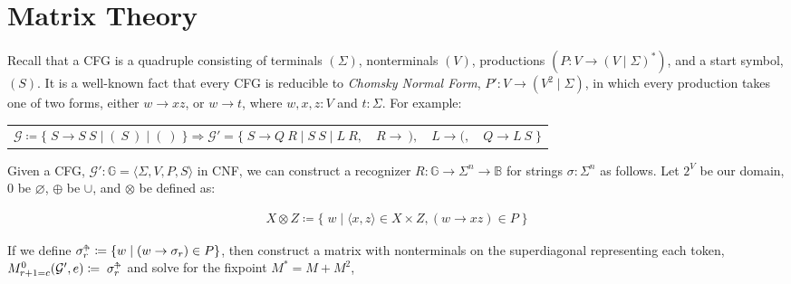\documentclass[sigplan,review,anonymous,acmsmall]{acmart}\settopmatter{printfolios=false,printccs=false,printacmref=false}
\begin{document}
\section{Matrix Theory}\label{sec:matrix}

Recall that a CFG is a quadruple consisting of terminals $(\Sigma)$, nonterminals $(V)$, productions $(P\colon V \rightarrow (V \mid \Sigma)^*)$, and a start symbol, $(S)$. It is a well-known fact that every CFG is reducible to \textit{Chomsky Normal Form}, $P'\colon V \rightarrow (V^2 \mid \Sigma)$, in which every production takes one of two forms, either $w \rightarrow xz$, or $w \rightarrow t$, where $w, x, z: V$ and $t: \Sigma$. For example:\vspace{-3pt}

\begin{table}[H]
\begin{tabular}{llll}
$\mathcal{G}\coloneqq\big\{\;S \rightarrow S\:S \mid (\:S\:) \mid (\:)\;\big\} \Longrightarrow \mathcal{G}'=\big\{\;S\rightarrow Q\:R \mid S\:S \mid L\:R,$ & $R \rightarrow\:),$ & $L \rightarrow (,$ & $Q\rightarrow L\:S\;\big\}$
\end{tabular}
\end{table}\vspace{-8pt}

\noindent Given a CFG, $\mathcal{G}' : \mathbb{G} = \langle \Sigma, V, P, S\rangle$ in CNF, we can construct a recognizer $R: \mathbb{G} \rightarrow \Sigma^n \rightarrow \mathbb{B}$ for strings $\sigma: \Sigma^n$ as follows. Let $2^V$ be our domain, $0$ be $\varnothing$, $\oplus$ be $\cup$, and $\otimes$ be defined as:\vspace{-10pt}

\begin{align}
X \otimes Z \coloneqq \big\{\;w \mid \langle x, z\rangle \in X \times Z, (w\rightarrow xz) \in P\;\big\}
\end{align}

\noindent If we define $\sigma_r^{\shortuparrow\hspace{-5pt}\shortrightarrow} \coloneqq \{w \mid (w \rightarrow \sigma_r) \in P\}$, then construct a matrix with nonterminals on the superdiagonal representing each token, $M^0_{r+1=c}(\mathcal{G}', e) \coloneqq \;\sigma_r^{\shortuparrow\hspace{-5pt}\shortrightarrow}$ and solve for the fixpoint $M^* = M + M^2$,\vspace{-10pt}
\end{document}
